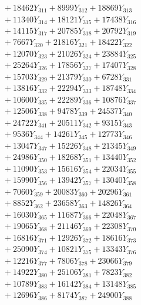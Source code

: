 \documentclass[a4paper,10pt]{article}
\begin{document}
{\begin{align}
&\;  + 18462 Y_{311} + 8999 Y_{312} + 18869 Y_{313} \\[0.3ex]
&\;  + 11340 Y_{314} + 18121 Y_{315} + 17438 Y_{316} \\[0.3ex]
&\;  + 14115 Y_{317} + 20785 Y_{318} + 20792 Y_{319} \\[0.3ex]
&\;  + 7667 Y_{320} + 21816 Y_{321} + 18422 Y_{322} \\[0.3ex]
&\;  + 12070 Y_{323} + 21026 Y_{324} + 23884 Y_{325} \\[0.3ex]
&\;  + 25264 Y_{326} + 17856 Y_{327} + 17407 Y_{328} \\[0.5ex]\allowbreak
&\;  + 15703 Y_{329} + 21379 Y_{330} + 6728 Y_{331} \\[0.3ex]
&\;  + 13816 Y_{332} + 22294 Y_{333} + 18748 Y_{334} \\[0.3ex]
&\;  + 10600 Y_{335} + 22289 Y_{336} + 10876 Y_{337} \\[0.3ex]
&\;  + 12506 Y_{338} + 9478 Y_{339} + 24537 Y_{340} \\[0.3ex]
&\;  + 24722 Y_{341} + 20511 Y_{342} + 9315 Y_{343} \\[0.3ex]
&\;  + 9536 Y_{344} + 14261 Y_{345} + 12773 Y_{346} \\[0.3ex]
&\;  + 13047 Y_{347} + 15226 Y_{348} + 21345 Y_{349} \\[0.3ex]
&\;  + 24986 Y_{350} + 18268 Y_{351} + 13440 Y_{352} \\[0.3ex]
&\;  + 11090 Y_{353} + 15616 Y_{354} + 22034 Y_{355} \\[0.3ex]
&\;  + 15990 Y_{356} + 13942 Y_{357} + 13040 Y_{358} \\[0.5ex]\allowbreak
&\;  + 7060 Y_{359} + 20083 Y_{360} + 20296 Y_{361} \\[0.3ex]
&\;  + 8852 Y_{362} + 23658 Y_{363} + 14826 Y_{364} \\[0.3ex]
&\;  + 16030 Y_{365} + 11687 Y_{366} + 22048 Y_{367} \\[0.3ex]
&\;  + 19065 Y_{368} + 21146 Y_{369} + 22308 Y_{370} \\[0.3ex]
&\;  + 16816 Y_{371} + 12926 Y_{372} + 18616 Y_{373} \\[0.3ex]
&\;  + 25090 Y_{374} + 10821 Y_{375} + 13343 Y_{376} \\[0.3ex]
&\;  + 12216 Y_{377} + 7806 Y_{378} + 23066 Y_{379} \\[0.3ex]
&\;  + 14922 Y_{380} + 25106 Y_{381} + 7823 Y_{382} \\[0.3ex]
&\;  + 10789 Y_{383} + 16142 Y_{384} + 13148 Y_{385} \\[0.3ex]
&\;  + 12696 Y_{386} + 8174 Y_{387} + 24900 Y_{388} \\[0.5ex]\allowbreak

\end{align}}
\end{document}

